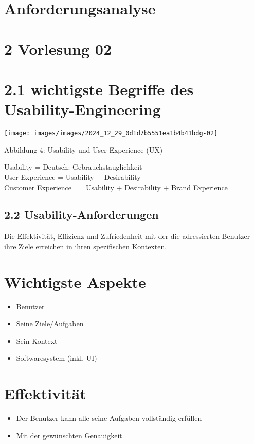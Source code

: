 \section{Anforderungsanalyse}

\section*{2 Vorlesung 02}
\section*{2.1 wichtigste Begriffe des Usability-Engineering}
\begin{center}
\texttt{[image: images/images/2024\_12\_29\_0d1d7b5551ea1b4b41bdg-02]}
\end{center}


Abbildung 4: Usability und User Experience (UX)


Usability = Deutsch: Gebrauchstauglichkeit\\
User Experience = Usability + Desirability\\
Customer Experience $=$ Usability + Desirability + Brand Experience

\subsection*{2.2 Usability-Anforderungen}
Die Effektivität, Effizienz und Zufriedenheit mit der die adressierten Benutzer ihre Ziele erreichen in ihren spezifischen Kontexten.

\section*{Wichtigste Aspekte}
\begin{itemize}
  \item Benutzer
  \item Seine Ziele/Aufgaben
  \item Sein Kontext
  \item Softwaresystem (inkl. UI)
\end{itemize}

\section*{Effektivität}
\begin{itemize}
  \item Der Benutzer kann alle seine Aufgaben vollständig erfüllen
  \item Mit der gewünschten Genauigkeit
\end{itemize}

